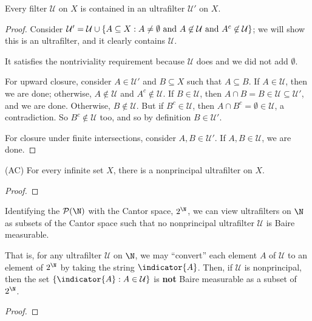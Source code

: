 \documentclass[10pt]{article}
\begin{document}
\begin{lemma}
    Every filter $\mathcal{U}$ on $X$ is contained in an ultrafilter $\mathcal{U}'$ on $X$.
\end{lemma}
\begin{proof}
    Consider $\mathcal{U}' = \mathcal{U} \cup \left\{ {A \subseteq X} : {A \neq \emptyset ~\text{and}~ A \not\in \mathcal{U} ~\text{and}~ A^c \not\in \mathcal{U}} \right\}$; we will show this is an ultrafilter, and it clearly contains $\mathcal{U}$.

    It satisfies the nontriviality requirement because $\mathcal{U}$ does and we did not add $\emptyset$.

    For upward closure, consider $A \in \mathcal{U}'$ and $B \subseteq X$ such that $A \subseteq B$.
    If $A \in \mathcal{U}$, then we are done; otherwise, $A \not\in \mathcal{U}$ and $A^c \not\in \mathcal{U}$.
    If $B \in \mathcal{U}$, then $A \cap B = B \in \mathcal{U} \subseteq \mathcal{U}'$, and we are done.
    Otherwise, $B \not\in \mathcal{U}$.
    But if $B^c \in \mathcal{U}$, then $A \cap B^c = \emptyset \in \mathcal{U}$, a contradiction.
    So $B^c \not\in \mathcal{U}$ too, and so by definition $B \in \mathcal{U}'$.

    For closure under finite intersections, consider $A, B \in \mathcal{U}'$.
    If $A, B \in \mathcal{U}$, we are done.

\end{proof}

\begin{proposition}[Exercise 52a]
    (AC) For every infinite set $X$, there is a nonprincipal ultrafilter on $X$.
\end{proposition}
\begin{proof}
\end{proof}

\begin{proposition}[Exercise 52b]
    Identifying the $\powerset{\N}$ with the Cantor space, $2^\N$, we can view ultrafilters on $\N$ as subsets of the Cantor space such that no nonprincipal ultrafilter $\mathcal{U}$ is Baire measurable.

    That is, for any ultrafilter $\mathcal{U}$ on $\N$, we may ``convert'' each element $A$ of $\mathcal{U}$ to an element of $2^\N$ by taking the string $\indicator{A}$.
    Then, if $\mathcal{U}$ is nonprincipal, then the set $\setbuild{ \indicator{A} }{ A \in \mathcal{U} }$ is \textbf{not} Baire measurable as a subset of $2^\N$.
\end{proposition}
\begin{proof}
\end{proof}
\end{document}

